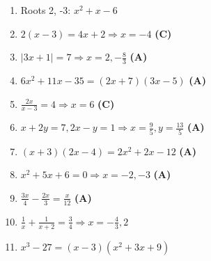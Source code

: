 \documentclass[12pt]{article}
\begin{document}
\begin{enumerate}[label=\textbf{Question \arabic*:}]
  \item Roots 2, -3: \( x^2 + x - 6 \)
  \item \( 2(x - 3) = 4x + 2 \Rightarrow x = -4 \) \textbf{(C)}
  \item \( |3x + 1| = 7 \Rightarrow x = 2, -\frac{8}{3} \) \textbf{(A)}
  \item \( 6x^2 + 11x - 35 = (2x + 7)(3x - 5) \) \textbf{(A)}
  \item \( \frac{2x}{x - 3} = 4 \Rightarrow x = 6 \) \textbf{(C)}
  \item \( x + 2y = 7, 2x - y = 1 \Rightarrow x = \frac{9}{5}, y = \frac{13}{5} \) \textbf{(A)}
  \item \( (x + 3)(2x - 4) = 2x^2 + 2x - 12 \) \textbf{(A)}
  \item \( x^2 + 5x + 6 = 0 \Rightarrow x = -2, -3 \) \textbf{(A)}
  \item \( \frac{3x}{4} - \frac{2x}{3} = \frac{x}{12} \) \textbf{(A)}
  \item \( \frac{1}{x} + \frac{1}{x + 2} = \frac{3}{4} \Rightarrow x = -\frac{4}{3}, 2 \)
  \item \( x^3 - 27 = (x - 3)(x^2 + 3x + 9) \)
\end{enumerate}

\newpage
\end{document}
